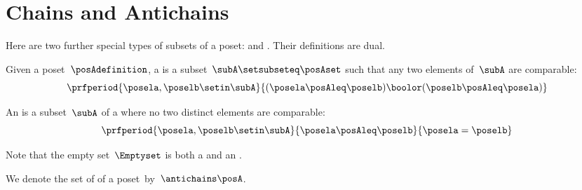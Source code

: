 
\section{Chains and Antichains}
\label{sec:chains-antichains}


Here are two further special types of subsets of a poset:  and .
Their definitions are dual.

\begin{definition}
    \label{def:chain}
    Given a poset~$\posAdefinition$, a  is a subset~$\subA \setsubseteq \posAset$ such that any two elements of~$\subA$ are comparable:
    \begin{equation}\label{eq:chain}
        \prfperiod{
            \posela,\poselb \setin \subA
        }{
            (\posela \posAleq \poselb) \boolor (\poselb \posAleq \posela)
        }
    \end{equation}
\end{definition}


\begin{definition}
    \label{def:antichain}
    An  is a subset~$\subA$ of a  where no two distinct elements are comparable:
    \begin{equation}\label{eq:antichain}
        \prfperiod{
            \posela, \poselb \setin \subA
        }{
            \posela \posAleq \poselb
        }{
            \posela = \poselb
        }
    \end{equation}
\end{definition}
\begin{remark}
    Note that the empty set~$\Emptyset$ is both a  and an .
\end{remark}

We denote the set of  of a poset~\posA by~$\antichains\posA$.

